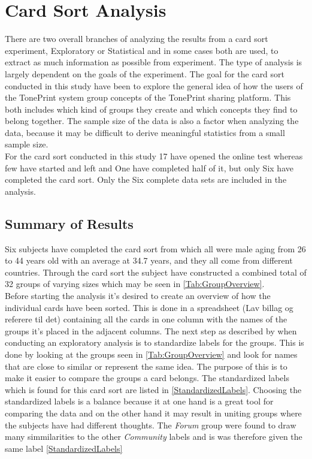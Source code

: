 \chapter{Card Sort Analysis}
\label{CardSortAnalysis}
%
There are two overall branches of analyzing the results from a card sort experiment, Exploratory or Statistical and in some cases both are used, to extract as much information as possible from experiment. The type of analysis is largely dependent on the goals of the experiment. The goal for the card sort conducted in this study have been to explore the general idea of how the users of the TonePrint system group concepts of the TonePrint sharing platform. This both includes which kind of groups they create and which concepts they find to belong together. The sample size of the data is also a factor when analyzing the data, because it may be difficult to derive meaningful statistics from a small sample size. \\
For the card sort conducted in this study 17 have opened the online test whereas few have started and left and One have completed half of it, but only Six have completed the card sort. Only the Six complete data sets are included in the analysis.

\section{Summary of Results}
\label{SummaryResults}
%
Six subjects have completed the card sort from which all were male aging from 26 to 44 years old with an average at 34.7 years, and they all come from different countries. Through the card sort the subject have constructed a combined total of 32 groups of varying sizes which may be seen in \autoref{Tab:GroupOverview}. \\ 
Before starting the analysis it's desired to create an overview of how the individual cards have been sorted. This is done in a spreadsheet (Lav billag og referere til det) containing all the cards in one column with the names of the groups it's placed in the adjacent columns. The next step as described by \textcite[184]{WEB:DonnaSpencer} when conducting an exploratory analysis is to standardize labels for the groups. This is done by looking at the groups seen in \autoref{Tab:GroupOverview} and look for names that are close to similar or represent the same idea. The purpose of this is to make it easier to compare the groups a card belongs. The standardized labels which is found for this card sort are listed in \autoref{StandardizedLabels}. Choosing the standardized labels is a balance because it at one hand is a great tool for comparing the data and on the other hand it may result in uniting groups where the subjects have had different thoughts. The \textit{Forum} group were found to draw many simmilarities to the other \textit{Community} labels and is was therefore given the same label \autoref{StandardizedLabels} \\

